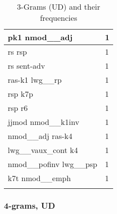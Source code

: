 \documentclass[a4 paper]{article}
\begin{document}
\begin{longtable}{p{}p{}}
pk1 nmod\_\_adj  & 1 \\ \midrule
rs rsp  & 1 \\ \midrule
rs sent-adv  & 1 \\ \midrule
ras-k1 lwg\_\_rp  & 1 \\ \midrule
rsp k7p  & 1 \\ \midrule
rsp r6  & 1 \\ \midrule
jjmod nmod\_\_k1inv  & 1 \\ \midrule
nmod\_\_adj ras-k4  & 1 \\ \midrule
lwg\_\_vaux\_cont k4  & 1 \\ \midrule
nmod\_\_pofinv lwg\_\_psp  & 1 \\ \midrule
k7t nmod\_\_emph  & 1 \\ \midrule
    \caption{3-Grams (UD) and their frequencies}
\label{tab:ngram3ud}
\end{longtable}
    

\subsubsection{4-grams, UD}
\end{document}
